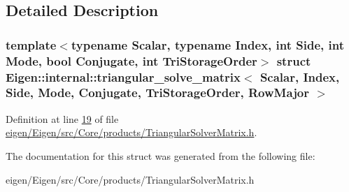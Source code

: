 \subsection{Detailed Description}
\subsubsection*{template$<$typename Scalar, typename Index, int Side, int Mode, bool Conjugate, int Tri\+Storage\+Order$>$\newline
struct Eigen\+::internal\+::triangular\+\_\+solve\+\_\+matrix$<$ Scalar, Index, Side, Mode, Conjugate, Tri\+Storage\+Order, Row\+Major $>$}



Definition at line \hyperlink{eigen_2_eigen_2src_2_core_2products_2_triangular_solver_matrix_8h_source_l00019}{19} of file \hyperlink{eigen_2_eigen_2src_2_core_2products_2_triangular_solver_matrix_8h_source}{eigen/\+Eigen/src/\+Core/products/\+Triangular\+Solver\+Matrix.\+h}.



The documentation for this struct was generated from the following file\+:\begin{DoxyCompactItemize}
\item 
eigen/\+Eigen/src/\+Core/products/\+Triangular\+Solver\+Matrix.\+h\end{DoxyCompactItemize}

